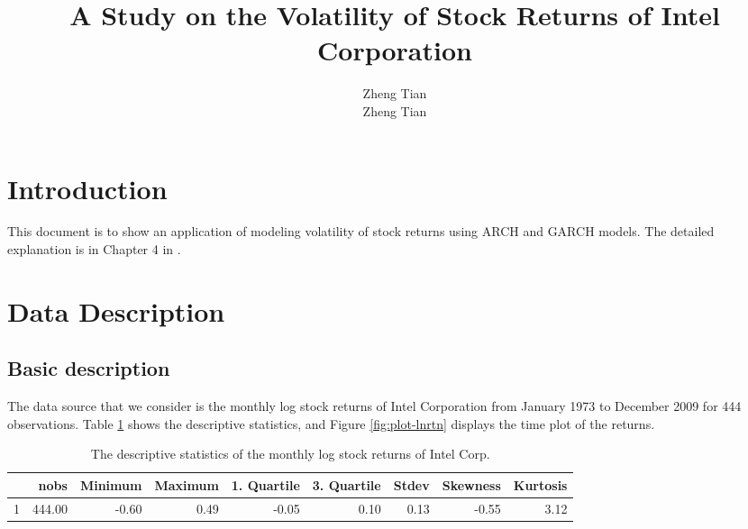 \documentclass[a4paper,11pt]{article}\usepackage[]{graphicx}\usepackage[]{color}
\title{A Study on the Volatility of Stock Returns of Intel Corporation}
\author{Zheng Tian \\
        Zheng Tian}
\begin{document}
\maketitle
\section{Introduction}
\label{sec:intro}

This document is to show an application of modeling volatility of stock returns using ARCH and GARCH models. The detailed explanation is in Chapter 4 in \citet{Tsay2013}. 





\section{Data Description}
\label{sec:data_descrip}

\subsection*{Basic description}

The data source that we consider is the monthly log stock returns of Intel Corporation from January 1973 to December 2009 for 444 observations. Table \ref{tab:descp_stats} shows the descriptive statistics, and Figure \ref{fig:plot-lnrtn} displays the time plot of the returns. 



\begin{table}[ht]
\centering
\caption{The descriptive statistics of the monthly
                  log stock returns of Intel Corp.} 
\label{tab:descp_stats}
\begin{tabular}{rrrrrrrrr}
  \hline
 & nobs & Minimum & Maximum & 1. Quartile & 3. Quartile & Stdev & Skewness & Kurtosis \\ 
  \hline
1 & 444.00 & -0.60 & 0.49 & -0.05 & 0.10 & 0.13 & -0.55 & 3.12 \\ 
   \hline
\end{tabular}
\end{table}
\end{document}
